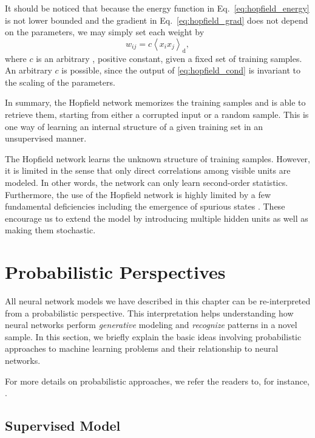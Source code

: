 \documentclass[dissertation,nocontribution]{aaltoseries}
\newcommand{\td}[0]{\text{d}}
\begin{document}
It should be noticed that because the energy function in
Eq.~\eqref{eq:hopfield_energy} is not lower bounded and the
gradient in Eq.~\eqref{eq:hopfield_grad} does not depend on
the parameters, we may simply set each weight by
\[
w_{ij} = c \left< x_i x_j \right>_\td,
\]
where $c$ is an arbitrary
, positive constant, given a fixed set of training samples. An
arbitrary $c$ is possible, since the output of
\eqref{eq:hopfield_cond} is invariant to the scaling of the
parameters. 

In summary, the Hopfield network memorizes the training
samples and is able to retrieve them, starting from either a
corrupted input or a random sample. This is one way of
learning an internal structure of a given training set in an
unsupervised manner.

The Hopfield network learns the unknown structure of
training samples. However, it is limited in the sense that
only direct correlations among visible units are modeled. In
other words, the network can only learn second-order
statistics. Furthermore, the use of the Hopfield network is
highly limited by a few fundamental deficiencies including the emergence
of spurious states \citep[for more details,
see][]{Haykin2009}. These encourage us to extend the
model by introducing multiple hidden units as well as
making them stochastic.

\section{Probabilistic Perspectives}
\label{sec:prob_perspective}

All neural network models we have described in this chapter
can be re-interpreted from a probabilistic perspective. This
interpretation helps understanding how neural networks
perform \textit{generative} modeling and \textit{recognize}
patterns in a novel sample.  In this section, we briefly
explain the basic ideas involving probabilistic approaches
to machine learning problems and their relationship to neural
networks.

For more details on probabilistic approaches, we refer
the readers to, for instance, \citep{Murphy2012,Barber2012,Bishop2006}. 

\subsection{Supervised Model}
\end{document}
